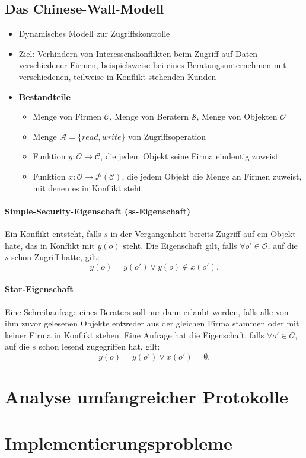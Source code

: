 \subsection{Das Chinese-Wall-Modell}
\begin{itemize}
	\item Dynamisches Modell zur Zugriffskontrolle
	\item Ziel: Verhindern von Interessenskonflikten beim Zugriff auf Daten verschiedener Firmen, beispielsweise bei eines Beratungsunternehmen mit verschiedenen, teilweise in Konflikt stehenden Kunden
	\item \textbf{Bestandteile}
	\begin{itemize}
		\item Menge von Firmen \(\mathcal{C}\), Menge von Beratern \(\mathcal{S}\), Menge von Objekten \(\mathcal{O}\)
		\item Menge \(\mathcal{A} = \{read,write\}\) von Zugriffsoperation
		\item Funktion \(y: \mathcal{O} \rightarrow \mathcal{C}\), die jedem Objekt seine Firma eindeutig zuweist
		\item Funktion \(x: \mathcal{O} \rightarrow \mathcal{P}(\mathcal{C})\), die jedem Objekt die Menge an Firmen zuweist, mit denen es in Konflikt steht
	\end{itemize}
\end{itemize}

\paragraph{Simple-Security-Eigenschaft (ss-Eigenschaft)}
Ein Konflikt entsteht, falls \(s\) in der Vergangenheit bereits Zugriff auf ein Objekt hate, das in Konflikt mit \(y(o)\) steht. Die Eigenschaft gilt, falls \(\forall o' \in \mathcal{O}\), auf die \(s\) schon Zugriff hatte, gilt:
\[y(o) = y(o') \vee y(o) \notin x(o').\]

\paragraph{Star-Eigenschaft}
Eine Schreibanfrage eines Beraters soll nur dann erlaubt werden, falls alle von ihm zuvor gelesenen Objekte entweder aus der gleichen Firma stammen oder mit keiner Firma in Konflikt stehen. Eine Anfrage hat die Eigenschaft, falls \(\forall o' \in \mathcal{O}\), auf die \(s\) schon lesend zugegriffen hat, gilt:
\[y(o) = y(o') \vee x(o') = \emptyset.\]



\section{Analyse umfangreicher Protokolle}



\section{Implementierungsprobleme}
